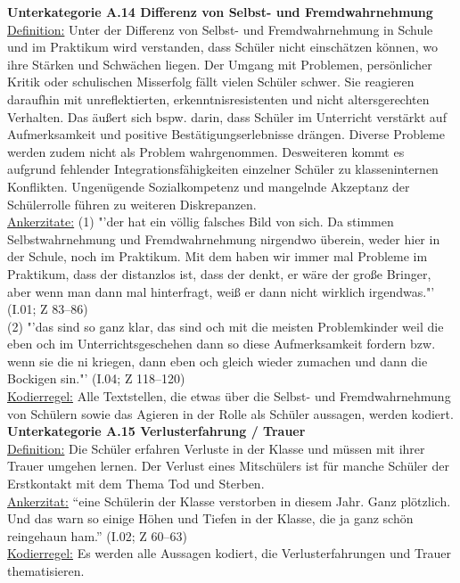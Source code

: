 \textbf{Unterkategorie A.14 Differenz von Selbst- und Fremdwahrnehmung}\\
\underline{Definition:} Unter der Differenz von Selbst- und Fremdwahrnehmung in Schule und im Praktikum wird verstanden, dass Schüler nicht einschätzen können, wo ihre Stärken und Schwächen liegen. Der Umgang mit Problemen, persönlicher Kritik oder schulischen Misserfolg fällt vielen Schüler schwer. Sie reagieren daraufhin mit unreflektierten, erkenntnisresistenten und nicht altersgerechten Verhalten. Das äußert sich bspw. darin, dass Schüler im Unterricht verstärkt auf Aufmerksamkeit und positive Bestätigungserlebnisse drängen. Diverse Probleme werden zudem nicht als Problem wahrgenommen. Desweiteren kommt es aufgrund fehlender Integrationsfähigkeiten einzelner Schüler zu klasseninternen Konflikten. Ungenügende Sozialkompetenz und mangelnde Akzeptanz der Schülerrolle führen zu weiteren Diskrepanzen.\\
\underline{Ankerzitate:} (1) "'der hat ein völlig falsches Bild von sich. Da stimmen Selbstwahrnehmung und Fremdwahrnehmung nirgendwo überein, weder hier in der Schule, noch im Praktikum. Mit dem haben wir immer mal Probleme im Praktikum, dass der distanzlos ist, dass der denkt, er wäre der große Bringer, aber wenn man dann mal hinterfragt, weiß er dann nicht wirklich irgendwas."' (I.01; Z 83--86)\\ (2) "'das sind so ganz klar, das sind och mit die meisten Problemkinder weil die eben och im Unterrichtsgeschehen dann so diese Aufmerksamkeit fordern bzw.  wenn sie die ni kriegen, dann eben och gleich wieder zumachen und dann die Bockigen sin."' (I.04; Z 118--120)\\
\underline{Kodierregel:} Alle Textstellen, die etwas über die Selbst- und Fremdwahrnehmung von Schülern sowie das Agieren in der Rolle als Schüler aussagen, werden kodiert.\\

\textbf{Unterkategorie A.15 Verlusterfahrung / Trauer}\\
\underline{Definition:} Die Schüler erfahren Verluste in der Klasse und müssen mit ihrer Trauer umgehen lernen. Der Verlust eines Mitschülers ist für manche Schüler der Erstkontakt mit dem Thema Tod und Sterben.\\
\underline{Ankerzitat:} "`eine Schülerin der Klasse verstorben in diesem Jahr. Ganz plötzlich. Und das warn so einige Höhen und Tiefen in der Klasse, die ja ganz schön reingehaun ham."' (I.02; Z 60--63)\\
\underline{Kodierregel:} Es werden alle Aussagen kodiert, die Verlusterfahrungen und Trauer thematisieren.\\

